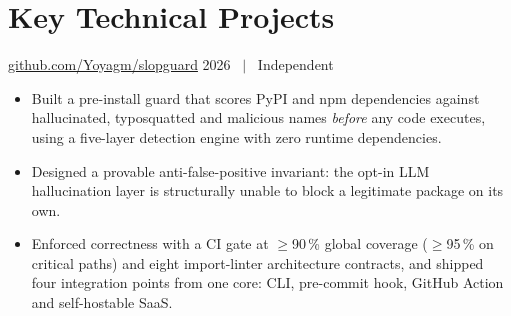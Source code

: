 \section{Key Technical Projects}

%
  {\href{https://github.com/Yoyagm/slopguard}{github.com/Yoyagm/slopguard}}%
  {2026 \ $\vert$ \ Independent}
\begin{itemize}
  \item Built a pre-install guard that scores PyPI and npm dependencies against hallucinated,
        typosquatted and malicious names \emph{before} any code executes, using a five-layer detection
        engine with zero runtime dependencies.
  \ifonepage\else
  \item Designed a provable anti-false-positive invariant: the opt-in LLM hallucination layer is
        structurally unable to block a legitimate package on its own.
  \fi
  \item Enforced correctness with a CI gate at $\geq$90\,\% global coverage ($\geq$95\,\% on critical
        paths) and eight import-linter architecture contracts, and shipped four integration points from
        one core: CLI, pre-commit hook, GitHub Action and self-hostable SaaS.
\end{itemize}

